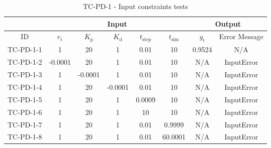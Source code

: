 \documentclass[12pt, titlepage]{article}
\begin{document}
\begin{table}[]
\begin{tabular}{lccccccc}
\hline
\multicolumn{1}{l|}{}   & \multicolumn{5}{c|}{Input}                            & \multicolumn{2}{c}{Output} \\ \hline
\multicolumn{1}{c|}{ID} & ${r_{\text{t}}}$ & ${K_{\text{p}}}$  & ${K_{\text{d}}}$ & ${t_{\text{step}}}$ & \multicolumn{1}{c|}{${t_{\text{sim}}}$} & ${y_{\text{t}}}$     & Error Message    \\ \hline
TC-PD-1-1 & 1       & 20      & 1       & 0.01   & 10      & 0.9524 & N/A        \\
TC-PD-1-2 & -0.0001 & 20      & 1       & 0.01   & 10      & N/A    & InputError \\
TC-PD-1-3 & 1       & -0.0001 & 1       & 0.01   & 10      & N/A    & InputError \\
TC-PD-1-4 & 1       & 20      & -0.0001 & 0.01   & 10      & N/A    & InputError \\
TC-PD-1-5 & 1       & 20      & 1       & 0.0009 & 10      & N/A    & InputError \\
TC-PD-1-6 & 1       & 20      & 1       & 10 & 10      & N/A    & InputError \\
TC-PD-1-7 & 1       & 20      & 1       & 0.01   & 0.9999  & N/A    & InputError \\
TC-PD-1-8 & 1       & 20      & 1       & 0.01   & 60.0001 & N/A    & InputError
\end{tabular}
\caption{TC-PD-1 - Input constraints tests}
\label{tab:tc-PD-1}
\end{table}
\end{document}
